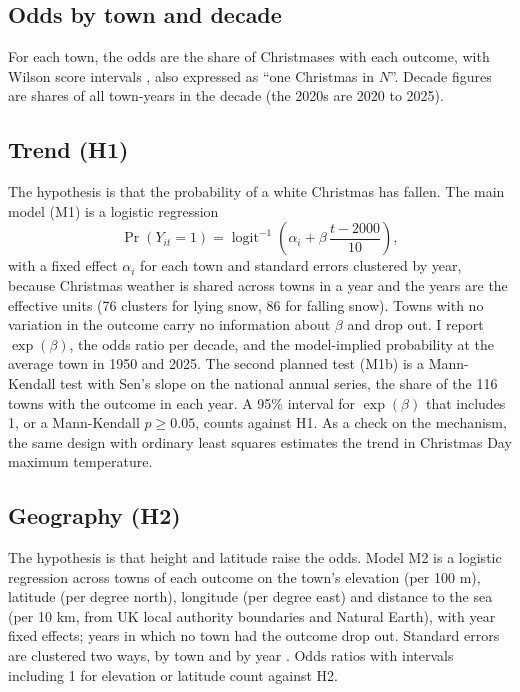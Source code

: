 \documentclass[11pt,a4paper]{article}
\begin{document}
\subsection{Odds by town and decade}
For each town, the odds are the share of Christmases with each outcome, with Wilson score intervals \citep{wilson1927}, also expressed as ``one Christmas in $N$''. Decade figures are shares of all town-years in the decade (the 2020s are 2020 to 2025).

\subsection{Trend (H1)}
The hypothesis is that the probability of a white Christmas has fallen. The main model (M1) is a logistic regression
\begin{equation}
\Pr(Y_{it}=1) = \operatorname{logit}^{-1}\left(\alpha_i + \beta\,\frac{t-2000}{10}\right),
\end{equation}
with a fixed effect $\alpha_i$ for each town and standard errors clustered by year, because Christmas weather is shared across towns in a year and the years are the effective units (76 clusters for lying snow, 86 for falling snow). Towns with no variation in the outcome carry no information about $\beta$ and drop out. I report $\exp(\beta)$, the odds ratio per decade, and the model-implied probability at the average town in 1950 and 2025. The second planned test (M1b) is a Mann-Kendall test \citep{mann1945} with Sen's slope \citep{sen1968} on the national annual series, the share of the 116 towns with the outcome in each year. A 95\% interval for $\exp(\beta)$ that includes 1, or a Mann-Kendall $p \geq 0.05$, counts against H1. As a check on the mechanism, the same design with ordinary least squares estimates the trend in Christmas Day maximum temperature.

\subsection{Geography (H2)}
The hypothesis is that height and latitude raise the odds. Model M2 is a logistic regression across towns of each outcome on the town's elevation (per 100 m), latitude (per degree north), longitude (per degree east) and distance to the sea (per 10 km, from UK local authority boundaries and Natural Earth), with year fixed effects; years in which no town had the outcome drop out. Standard errors are clustered two ways, by town and by year \citep{cameron2011}. Odds ratios with intervals including 1 for elevation or latitude count against H2.
\end{document}
